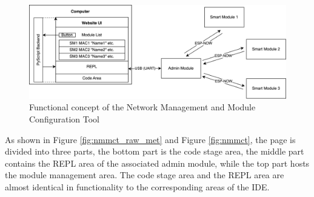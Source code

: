 \begin{figure}[H]
    \centering
    \includegraphics[width=\linewidth]{overleaf/images/backend_cropped.png}
    \vspace{.5\ftspace}
    \caption{Functional concept of the Network Management and Module Configuration Tool}
    \vspace{\ftspace}
    \label{fig:nmmct_concept}
\end{figure}

As shown in Figure \ref{fig:nmmct_raw_met} and Figure \ref{fig:nmmct}, the page is divided into three parts, the bottom part is the code stage area, the middle part contains the REPL area of the associated admin module, while the top part hosts the module management area. 
The code stage area and the REPL area are almost identical in functionality to the corresponding areas of the IDE. 

